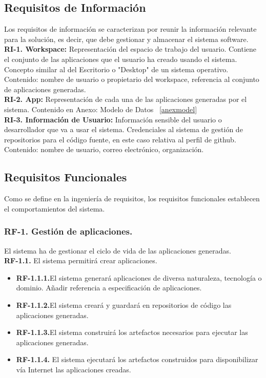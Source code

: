 \documentclass[a4paper,11pt]{book}
\begin{document}
\subsection{Requisitos de Información }
Los requisitos de información se caracterizan por reunir la información relevante para la solución, es decir, que debe gestionar y almacenar el sistema software.\\

\textbf{RI-1. Workspace:} Representación del espacio de trabajo del usuario. Contiene el conjunto de las aplicaciones que el usuario ha creado usando el sistema. Concepto similar al del Escritorio o "Desktop" de un sistema operativo.
Contenido: nombre de usuario o propietario del workspace, referencia al conjunto de aplicaciones generadas. \\
\textbf{RI-2. App:} Representación de cada una de las aplicaciones generadas por el sistema.
Contenido en Anexo: Modelo de Datos ~\ref{anexmodel}\\
\textbf{RI-3. Información de Usuario:} Información sensible del usuario o desarrollador que va a usar el sistema. Credenciales al sistema de gestión de repositorios para el código fuente, en este caso relativa al perfil de github.
Contenido: nombre de usuario, correo electrónico, organización. \\


\subsection{Requisitos Funcionales }
Como se define en la ingeniería de requisitos, los requisitos funcionales establecen el comportamientos del sistema.\\



\subsubsection { \textbf{ RF-1. Gestión de aplicaciones.}} El sistema ha de gestionar el ciclo de vida de las aplicaciones generadas.\\

\textbf{RF-1.1.} El sistema permitirá crear aplicaciones.
\begin{itemize}
 \item 	\textbf{RF-1.1.1.}El sistema generará aplicaciones de diversa naturaleza, tecnología o dominio. Añadir referencia a especificación de aplicaciones.
 \item 	\textbf{RF-1.1.2.}El sistema creará y  guardará en repositorios de código las aplicaciones generadas.
  \item \textbf{RF-1.1.3.}El sistema construirá los artefactos necesarios para ejecutar las aplicaciones generadas.
   \item  \textbf{RF-1.1.4.} El sistema ejecutará los artefactos construidos para disponibilizar vía Internet las aplicaciones creadas. \\
\end{itemize}
\end{document}
